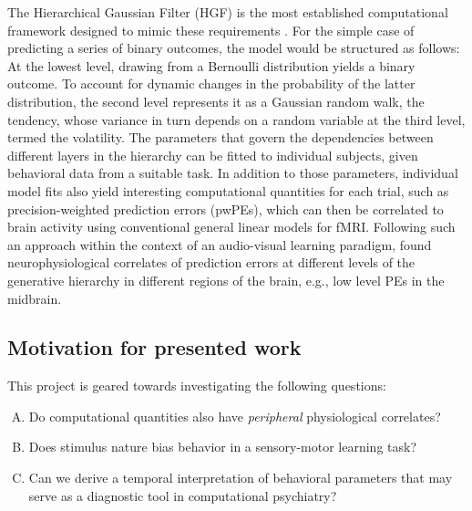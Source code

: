 \documentclass{article}
\begin{document}
\begin{multicols}{2}
The \textsf{Hierarchical Gaussian Filter} (HGF) is the most established computational framework designed to mimic these requirements \citep{Mathys2014}. For the simple case of predicting a series of binary outcomes, the model would be structured as follows: At the lowest level, drawing from a Bernoulli distribution yields a binary outcome. To account for dynamic changes in the probability of the latter distribution, the second level represents it as a Gaussian random walk, the \textsf{tendency}, whose variance in turn depends on a random variable at the third level, termed the \textsf{volatility}. The parameters that govern the dependencies between different layers in the hierarchy can be fitted to individual subjects, given behavioral data from a suitable task. In addition to those parameters, individual model fits also yield interesting computational quantities for each trial, such as \textsf{precision-weighted prediction errors (pwPEs)}, which can then be correlated to brain activity using conventional general linear models for fMRI. Following such an approach within the context of an audio-visual learning paradigm, \cite{iglesias2013hierarchical} found neurophysiological correlates of prediction errors at different levels of the generative hierarchy in different regions of the brain, e.g., low level PEs in the midbrain. \\

\subsection*{Motivation for presented work}
\label{sec:Q}
This project is geared towards investigating the following questions:
\begin{enumerate}[A.]
\item Do computational quantities also have \textit{peripheral} physiological correlates?
\item Does stimulus nature bias behavior in a sensory-motor learning task?
\item Can we derive a temporal interpretation of behavioral parameters that may serve as a  diagnostic tool in computational psychiatry?


\end{enumerate}
\end{multicols}
\end{document}
